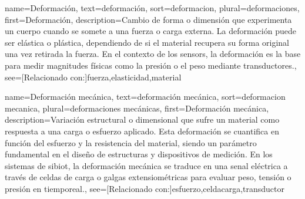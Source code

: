 	{
		name={Deformaci{\'o}n},
		text={deformaci{\'o}n},
		sort={deformacion},
		plural={deformaciones},
		first={Deformaci{\'o}n},
		description={Cambio de forma o dimensi{\'o}n que experimenta un cuerpo cuando se somete a una fuerza o carga externa. 
			La deformaci{\'o}n puede ser el{\'a}stica o pl{\'a}stica, dependiendo de si el material recupera su forma original una vez retirada la fuerza. 
			En el contexto de los \glspl{sensor}, la deformaci{\'o}n es la base para medir magnitudes f{\'i}sicas como la presi{\'o}n o el peso mediante transductores.},
		see=[Relacionado con:]{fuerza,elasticidad,material}
	}
	
	{
		name={Deformaci{\'o}n mec{\'a}nica},
		text={deformaci{\'o}n mec{\'a}nica},
		sort={deformacion mecanica},
		plural={deformaciones mec{\'a}nicas},
		first={Deformaci{\'o}n mec{\'a}nica},
		description={Variaci{\'o}n estructural o dimensional que sufre un material como respuesta a una carga o esfuerzo aplicado. 
			Esta deformaci{\'o}n se cuantifica en funci{\'o}n del esfuerzo y la resistencia del material, siendo un par{\'a}metro fundamental en el dise{\~n}o de estructuras y dispositivos de medici{\'o}n. 
			En los sistemas de \gls{sibiot}, la deformaci{\'o}n mec{\'a}nica se traduce en una \gls{senal} el{\'e}ctrica a trav{\'e}s de celdas de carga o galgas extensiom{\'e}tricas para evaluar peso, tensi{\'o}n o presi{\'o}n en \gls{tiemporeal}.},
		see=[Relacionado con:]{esfuerzo,celdacarga,transductor}
	}
	
	
